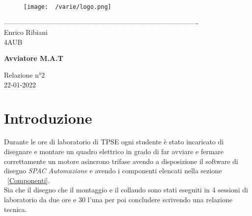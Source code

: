 \documentclass[12pt]{article}
\begin{document}
    \begin{titlepage}
    \begin{center}
\begin{figure}
    \centering
    \texttt{[image: ~/varie/logo.png]}
    \label{fig:logo}
\end{figure}
-------------------------------------------------------------------------------------\\
\vspace{2\baselineskip}
\large Enrico Ribiani\\
\large 4AUB\\
\vfill

\Huge{\textbf{Avviatore M.A.T}}\\
\vfill

\LARGE{Relazione n°2}\\
\vfill
\large{22-01-2022}
\end{center}
\end{titlepage}
\tableofcontents
\vskip 1cm
\section{Introduzione}
Durante le ore di laboratorio di TPSE ogni studente è stato incaricato di disegnare e montare un quadro elettrico in grado di far avviare e fermare correttamente un motore asincrono trifase avendo a disposizione il software di disegno \textit{SPAC Automazione} e avendo i componenti elencati nella sezione ~\ref{Componenti}.\\
Sia che il disegno che il montaggio e il collaudo sono stati eseguiti in 4 sessioni di laboratorio da due ore e 30 l'una per poi concludere scrivendo una relazione tecnica.
\end{document}
